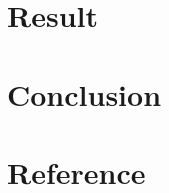 \documentclass[a4paper]{article}
\begin{document}
\newpage

\section{Result}

\newpage

\section{Conclusion}
	
\section{Reference}
\end{document}
